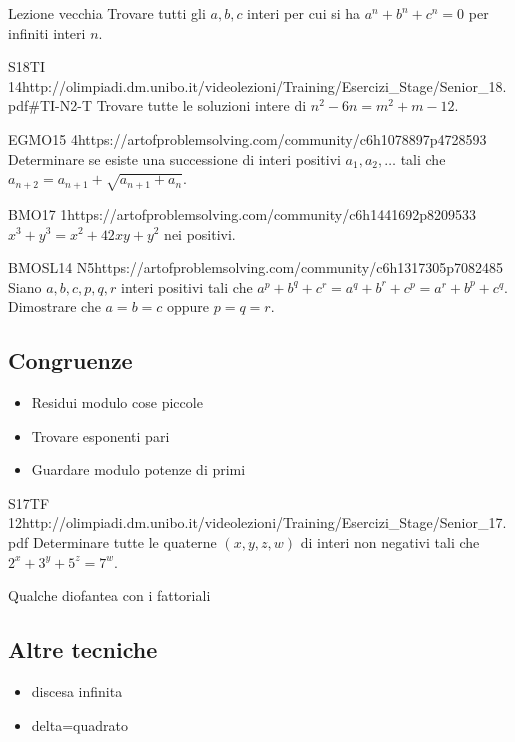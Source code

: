 \documentclass[12pt]{article}
\begin{document}
\begin{esercizio}{Lezione vecchia}{}
    Trovare tutti gli $a,b,c$ interi per cui si ha $a^n+b^n+c^n=0$ per infiniti interi $n$.
\end{esercizio}

\begin{esercizio}{S18TI 14}{http://olimpiadi.dm.unibo.it/videolezioni/Training/Esercizi_Stage/Senior_18.pdf\#TI-N2-T}
    Trovare tutte le soluzioni intere di $n^2-6n=m^2+m-12$.
\end{esercizio}

\begin{esercizio}{EGMO15 4}{https://artofproblemsolving.com/community/c6h1078897p4728593}
    Determinare se esiste una successione di interi positivi $a_1,a_2,\dots$ tali che $a_{n+2}=a_{n+1}+\sqrt{a_{n+1}+a_n}$.
\end{esercizio}

\begin{esercizio}{BMO17 1}{https://artofproblemsolving.com/community/c6h1441692p8209533}
    $x^3+y^3=x^2+42xy+y^2$ nei positivi.
\end{esercizio}

\begin{esercizio}{BMOSL14 N5}{https://artofproblemsolving.com/community/c6h1317305p7082485}
    Siano $a,b,c,p,q,r$ interi positivi tali che $a^p+b^q+c^r=a^q+b^r+c^p=a^r+b^p+c^q$. Dimostrare che $a=b=c$ oppure $p=q=r$.
\end{esercizio}


\subsection{Congruenze}
\begin{itemize}
    \item Residui modulo cose piccole
    \item Trovare esponenti pari
    \item Guardare modulo potenze di primi
\end{itemize}

\begin{esercizio}{S17TF 12}{http://olimpiadi.dm.unibo.it/videolezioni/Training/Esercizi_Stage/Senior_17.pdf}
    Determinare tutte le quaterne $(x,y,z,w)$ di interi non negativi tali che $2^x+3^y+5^z=7^w$.
\end{esercizio}

Qualche diofantea con i fattoriali

\subsection{Altre tecniche}
\begin{itemize}
    \item discesa infinita
    \item delta=quadrato
\end{itemize}
\end{document}
